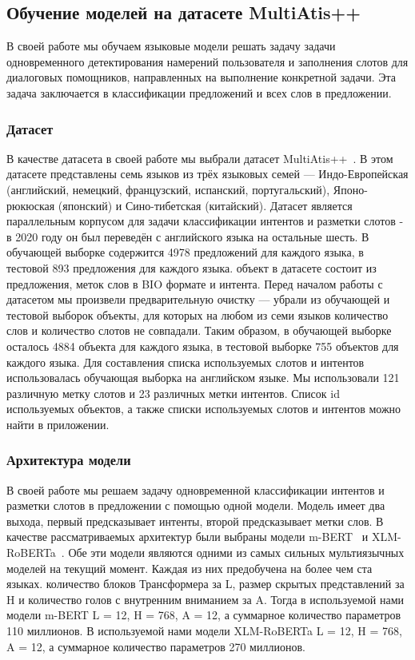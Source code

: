 \subsection{Обучение моделей на датасете MultiAtis++}
В своей работе мы обучаем языковые модели решать задачу задачи одновременного детектирования намерений пользователя и заполнения слотов для диалоговых помощников, направленных на выполнение конкретной задачи.
Эта задача заключается в классификации предложений и всех слов в предложении.

\subsubsection{Датасет}
В качестве датасета в своей работе мы выбрали датасет MultiAtis++~\cite{Xu2020EndtoEndSA}.
В этом датасете представлены семь языков из трёх языковых семей —
Индо-Европейская (английский, немецкий, французский, испанский, португальский), Японо-рюкюская (японский) и Сино-тибетская (китайский).
Датасет является параллельным корпусом для задачи классификации интентов и разметки слотов - в 2020 году он был переведён с английского языка на остальные шесть.
В обучающей выборке содержится 4978 предложений для каждого языка, в тестовой 893 предложения для каждого языка.
 объект в датасете состоит из предложения, меток слов в BIO формате и интента.
Перед началом работы с датасетом мы произвели предварительную очистку —
убрали из обучающей и тестовой выборок объекты, для которых на любом из семи языков количество слов и количество слотов не совпадали.
Таким образом, в обучающей выборке осталось 4884 объекта для каждого языка, в тестовой выборке 755 объектов для каждого языка.
Для составления списка используемых слотов и интентов использовалась обучающая выборка на английском языке.
Мы использовали 121 различную метку слотов и 23 различных метки интентов.
Список id используемых объектов, а также списки используемых слотов и интентов можно найти в приложении.

\subsubsection{Архитектура модели}
В своей работе мы решаем задачу одновременной классификации интентов и разметки слотов в предложении с помощью одной модели.
Модель имеет два выхода, первый предсказывает интенты, второй предсказывает метки слов.
В качестве рассматриваемых архитектур были выбраны модели m-BERT~\cite{devlin-etal-2019-bert} и XLM-RoBERTa~\cite{Conneau2020UnsupervisedCR}.
Обе эти модели являются одними из самых сильных мультиязычных моделей на текущий момент.
Каждая из них предобучена на более чем ста языках.
 количество блоков Трансформера за L, размер скрытых представлений за H и количество голов с внутренним вниманием за A\@.
Тогда в используемой нами модели m-BERT L = 12, H = 768, A = 12, а суммарное количество параметров 110 миллионов.
В используемой нами модели XLM-RoBERTa L = 12, H = 768, A = 12, а суммарное количество параметров 270 миллионов.

